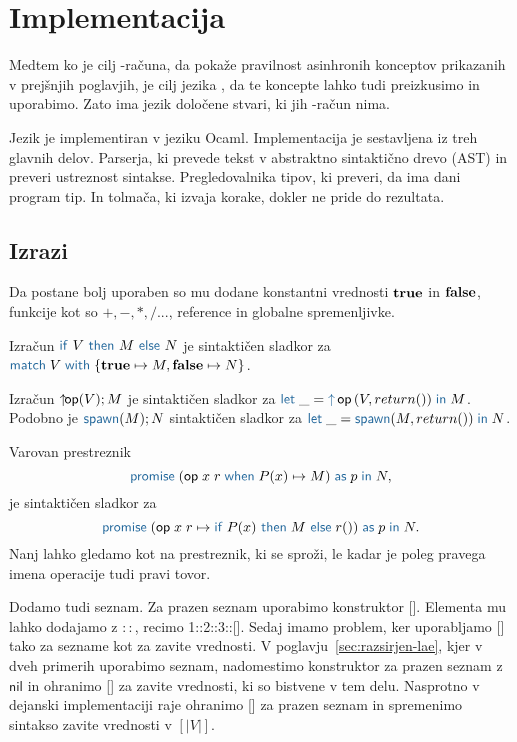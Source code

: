 \section{Implementacija}\label{sec:implementacija}

Medtem ko je cilj \lae-računa, da pokaže pravilnost asinhronih konceptov prikazanih v prejšnjih poglavjih, je cilj jezika \aeff{}, da te koncepte lahko tudi preizkusimo in uporabimo. Zato ima jezik \aeff{} določene stvari, ki jih \lae-račun nima.

Jezik \aeff{} je implementiran v jeziku Ocaml. Implementacija je sestavljena iz treh glavnih delov.
Parserja, ki prevede tekst v abstraktno sintaktično drevo (AST) in preveri ustreznost sintakse.  
Pregledovalnika tipov, ki preveri, da ima dani program tip.
In tolmača, ki izvaja korake, dokler ne pride do rezultata.

\subsection{Izrazi}

Da \aeff{} postane bolj uporaben so mu dodane konstantni vrednosti $\mathbf{true}$ in $\mathbf{false}$, funkcije kot so $+, -, *, / ...$, reference in globalne spremenljivke.

Izračun $\tmkw{if}\ V\ \tmkw{then}\ M\ \tmkw{else}\ N$ je sintaktičen sladkor za $\tmmatch{V}{\true \mapsto M, \false \mapsto N}$.

Izračun $\uparrow\hspace{-1ex}\mathsf{op} (V);M$ je sintaktičen sladkor za $\tmlet{\_}{\tmopout{op}{V}{return ()}}{M}$.
Podobno je $\tmkw{spawn}(M);N$ sintaktičen sladkor za $\tmlet{\_}{\tmspawn{M}{return ()}}{N}$. 

Varovan prestreznik $$\tmwithrecgu{op}{x}{r}{P(x)}{M}{p}{N},$$ je sintaktičen sladkor za $$\tmwithrec{op}{x}{r}{\tmif{P(x)}{M}{r()}}{p}{N}.$$
Nanj lahko gledamo kot na prestreznik, ki se sproži, le kadar je poleg pravega imena operacije tudi pravi tovor.

Dodamo tudi seznam. Za prazen seznam uporabimo konstruktor []. Elementa mu lahko dodajamo z $::$, recimo 1::2::3::[].
Sedaj imamo problem, ker uporabljamo [] tako za sezname kot za zavite vrednosti.
V poglavju~\ref{sec:razsirjen-lae}, kjer v dveh primerih uporabimo seznam, nadomestimo konstruktor za prazen seznam z $\mathsf{nil}$ in ohranimo [] za zavite vrednosti, ki so bistvene v tem delu.
Nasprotno v dejanski implementaciji \aeff{} raje ohranimo [] za prazen seznam in spremenimo sintakso zavite vrednosti v $[|V|]$. 



